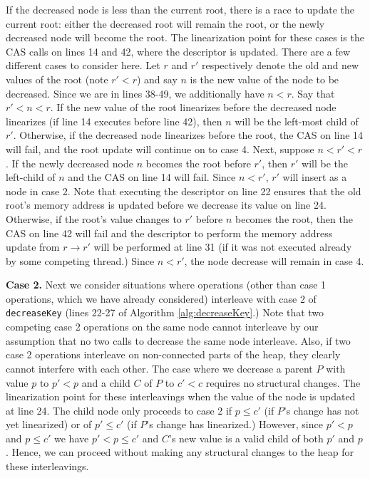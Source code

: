 \documentclass{acm_proc_article-sp}
\begin{document}
If the decreased node is less than the current root, there is a race to update
the current root: either the decreased root will remain the root, or the newly
decreased node will become the root. The linearization point
for these cases is the CAS calls on lines 14 and 42, where the descriptor is updated.
There are a few different cases to consider here. Let $r$ and $r'$ respectively
denote the old and new values of the root (note $r' < r$) and say $n$ is the 
new value of the node to be decreased. Since we are in lines 38-49, 
we additionally have $n < r$. Say that $r' < n < r$. If the new value of the
root linearizes before the decreased node linearizes (if line 14 executes
before line 42), then $n$ will be the left-most child of $r'$. Otherwise,
if the decreased node linearizes before the root, the CAS on line 14 will
fail, and the root update will continue on to case 4. Next, suppose
$n < r' < r$. If the newly decreased node $n$ becomes the root
before $r'$, then $r'$ will be the left-child of $n$ and the CAS
on line 14 will fail. Since $n < r'$, $r'$ will insert as a node in case 2.
Note that executing the descriptor on line 22 ensures that the old root's
memory address is updated before we decrease its value on line 24. Otherwise,
if the root's value changes to $r'$ before $n$ becomes the root, then the CAS
on line 42 will fail and the descriptor to perform the memory address
update from $r \rightarrow r'$ will be performed at line 31 (if it was
not executed already by some competing thread.) Since $n < r'$,
the node decrease will remain in case 4.

\textbf{Case 2.} 
Next we consider situations where
operations (other than case 1 operations, which we have
already considered) interleave with case 2 of \texttt{decreaseKey} (lines 22-27 of Algorithm
\ref{alg:decreaseKey}.) Note that two competing case 2 operations on the same
node cannot interleave by our assumption that no two calls to decrease the
same node interleave. Also, if two case 2 operations interleave on
non-connected parts of the heap, they clearly cannot interfere with
each other. The case where we decrease a parent $P$ with value $p$ to $p' < p$
and a child $C$ of $P$ to $c' < c$ requires no structural changes. The linearization
point for these interleavings when the value of the node is updated at line 24.
The child node only proceeds to case 2 if $p \leq c'$ (if $P$'s change has not yet
linearized) or of $p' \leq c'$ (if $P$'s change has linearized.) However, since $p' < p$
and $p \leq c'$ we have $p' < p \leq c'$ and $C$'s new value is a valid child of
both $p'$ and $p$. Hence, we can proceed without making any structural changes to the heap
for these interleavings.
\end{document}
